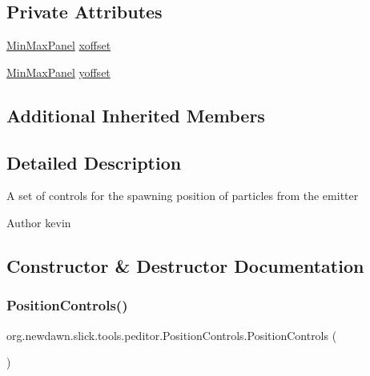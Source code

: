 \subsection*{Private Attributes}
\begin{DoxyCompactItemize}
\item 
\mbox{\hyperlink{classorg_1_1newdawn_1_1slick_1_1tools_1_1peditor_1_1_min_max_panel}{Min\+Max\+Panel}} \mbox{\hyperlink{classorg_1_1newdawn_1_1slick_1_1tools_1_1peditor_1_1_position_controls_a5359752fcf9f38522fe43da65b639303}{xoffset}}
\item 
\mbox{\hyperlink{classorg_1_1newdawn_1_1slick_1_1tools_1_1peditor_1_1_min_max_panel}{Min\+Max\+Panel}} \mbox{\hyperlink{classorg_1_1newdawn_1_1slick_1_1tools_1_1peditor_1_1_position_controls_a846a05883448e390fe31c3a726619b86}{yoffset}}
\end{DoxyCompactItemize}
\subsection*{Additional Inherited Members}


\subsection{Detailed Description}
A set of controls for the spawning position of particles from the emitter

\begin{DoxyAuthor}{Author}
kevin 
\end{DoxyAuthor}


\subsection{Constructor \& Destructor Documentation}
\mbox{\label{classorg_1_1newdawn_1_1slick_1_1tools_1_1peditor_1_1_position_controls_a038f5e0c0fd697f1c3c07587b8f088aa}} 
\subsubsection{\texorpdfstring{Position\+Controls()}{PositionControls()}}
{\footnotesize\ttfamily org.\+newdawn.\+slick.\+tools.\+peditor.\+Position\+Controls.\+Position\+Controls (\begin{DoxyParamCaption}{ }\end{DoxyParamCaption})\hspace{0.3cm}{\ttfamily [inline]}}

